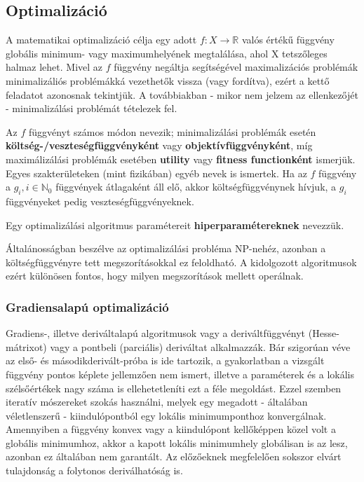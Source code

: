 \subsection{Optimalizáció} \label{optimization}

A matematikai optimalizáció célja egy adott $f: X \rightarrow \mathbb{R} $ valós értékű függvény globális minimum- vagy maximumhelyének megtalálása, ahol X tetszőleges halmaz lehet. Mivel az $f$ függvény negáltja segítségével maximalizációs problémák minimalizáliós problémákká vezethetők vissza (vagy fordítva), ezért a kettő feladatot azonosnak tekintjük. A továbbiakban - mikor nem jelzem az ellenkezőjét - minimalizálási problémát tételezek fel.

\begin{definition}
Az $f$ függvényt számos módon nevezik; minimalizálási problémák esetén \textbf{költség-/veszteségfüggvényként} vagy \textbf{objektívfüggvényként}, míg maximálizálási problémák esetében \textbf{utility} vagy \textbf{fitness functionként} ismerjük. Egyes szakterületeken (mint fizikában) egyéb nevek is ismertek. Ha az $f$ függvény a $g_i, i \in \mathbb{N}_0$ függvények átlagaként áll elő, akkor költségfüggvénynek hívjuk, a $g_i$ függvényeket pedig veszteségfüggvényeknek.
\end{definition}

\begin{definition}
Egy optimalizálási algoritmus paramétereit \textbf{hiperparamétereknek} nevezzük.
\end{definition}

Általánosságban beszélve az optimalizálási probléma NP-nehéz, azonban a költségfüggvényre tett megszorításokkal ez feloldható. A kidolgozott algoritmusok ezért különösen fontos, hogy milyen megszorítások mellett operálnak.

\subsubsection{Gradiensalapú optimalizáció}
Gradiens-, illetve deriváltalapú algoritmusok vagy a deriváltfüggvényt (Hesse-mátrixot) vagy a pontbeli (parciális) deriváltat alkalmazzák. Bár szigorúan véve az első- és másodikderivált-próba is ide tartozik, a gyakorlatban a vizsgált függvény pontos képlete jellemzően nem ismert, illetve a paraméterek és a lokális szélsőértékek nagy száma is ellehetetleníti ezt a féle megoldást. Ezzel szemben iteratív mószereket szokás használni, melyek egy megadott - általában véletlenszerű - kiindulópontból egy lokális minimumponthoz konvergálnak. Amennyiben a függvény konvex vagy a kiindulópont kellőképpen közel volt a globális minimumhoz, akkor a kapott lokális minimumhely globálisan is az lesz, azonban ez általában nem garantált. Az előzőeknek megfelelően sokszor elvárt tulajdonság a folytonos deriválhatóság is.


